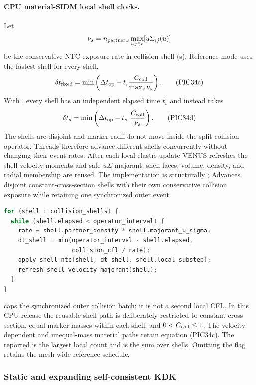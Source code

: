 \paragraph{CPU material-SIDM local shell clocks.}
Let
\[
 \nu_s=n_{{\rm partner},s}
       \max_{i,j\in s}[u\Sigma_{ij}(u)]
\]
be the conservative NTC exposure rate in collision shell (s).  Reference
mode uses the fastest shell for every shell,
\[
 \delta t_{\rm fixed}=\min\left(
 \Delta t_{\rm op}-t,
 \frac{C_{\rm coll}}{\max_s\nu_s}\right).             \tag{PIC34c}
\]
With , every shell has an
independent elapsed time \(t_s\) and instead takes
\[
 \delta t_s=\min\left(
 \Delta t_{\rm op}-t_s,
 \frac{C_{\rm coll}}{\nu_s}\right).                    \tag{PIC34d}
\]
The shells are disjoint and marker radii do not move inside the split
collision operator.  Threads therefore advance different shells concurrently
without changing their event rates.  After each local elastic update VENUS
refreshes the shell velocity moments and safe \(u\Sigma\) majorant; shell
faces, volume, density, and radial membership are reused.  The implementation
is structurally
{;
 }
{Advances disjoint constant-cross-section shells with their own conservative
 collision exposure while retaining one synchronized outer event}
\begin{lstlisting}[language=C++]
for (shell : collision_shells) {
  while (shell.elapsed < operator_interval) {
    rate = shell.partner_density * shell.majorant_u_sigma;
    dt_shell = min(operator_interval - shell.elapsed,
                   collision_cfl / rate);
    apply_shell_ntc(shell, dt_shell, shell.local_substep);
    refresh_shell_velocity_majorant(shell);
  }
}
\end{lstlisting}
 caps the synchronized outer
collision batch; it is not a second local CFL.  In this CPU release the
reusable-shell path is deliberately restricted to constant cross section,
equal marker masses within each shell, and \(0<C_{\rm coll}\le1\).  The
velocity-dependent and unequal-mass material paths retain equation (PIC34c).
The reported  is the largest local count and
 is the sum over shells.  Omitting the flag retains the
mesh-wide reference schedule.

\subsubsection{Static and expanding self-consistent KDK}
\label{sec:wpic-expanding-kdk}

